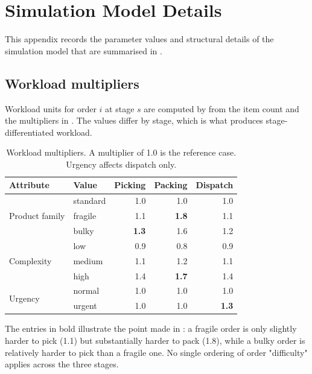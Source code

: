 \chapter{Simulation Model Details}
\label{app:B}

This appendix records the parameter values and structural details of the simulation model that
are summarised in .

\section{Workload multipliers}

Workload units for order \(i\) at stage \(s\) are computed by  from the
item count and the multipliers in . The values differ by stage, which is
what produces stage-differentiated workload.

\begin{table}[htbp]
\centering
\caption[Workload multipliers by stage]{Workload multipliers. A multiplier of \num{1.0} is the
reference case. Urgency affects dispatch only.}
\label{tab:multipliers}
\small
\begin{tabular}{llrrr}
\toprule
\textbf{Attribute} & \textbf{Value} & \textbf{Picking} & \textbf{Packing} & \textbf{Dispatch} \\
\midrule
\multirow{3}{*}{Product family}
 & standard & 1.0 & 1.0 & 1.0 \\
 & fragile  & 1.1 & \textbf{1.8} & 1.1 \\
 & bulky    & \textbf{1.3} & 1.6 & 1.2 \\
\midrule
\multirow{3}{*}{Complexity}
 & low    & 0.9 & 0.8 & 0.9 \\
 & medium & 1.1 & 1.2 & 1.1 \\
 & high   & 1.4 & \textbf{1.7} & 1.4 \\
\midrule
\multirow{2}{*}{Urgency}
 & normal & 1.0 & 1.0 & 1.0 \\
 & urgent & 1.0 & 1.0 & \textbf{1.3} \\
\bottomrule
\end{tabular}
\end{table}

The entries in bold illustrate the point made in : a fragile order
is only slightly harder to pick (\num{1.1}) but substantially harder to pack (\num{1.8}), while
a bulky order is relatively harder to pick than a fragile one. No single ordering of order
"difficulty" applies across the three stages.

